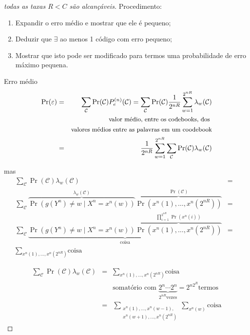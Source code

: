 \begin{frame}[allowframebreaks]
\begin{proof}[todas as taxas $R < C$ são alcançáveis]
  \proofbreak

  Procedimento:
  \begin{enumerate}
  \item Expandir o erro médio e mostrar que ele é pequeno;
  \item Deduzir que $\exists$ ao menos 1 código com erro pequeno;
  \item Mostrar que isto pode ser modificado para termos uma probabilidade de erro máximo pequena.
  \end{enumerate}

  \proofbreak
  Erro médio
  \begin{eqnarray}
  \Pr(\varepsilon) &=& \sum_{\mathcal{C}} \Pr(\mathcal{C}) P_e^{(n)}(\mathcal{C}) = \sum_{\mathcal{C}} \Pr(\mathcal{C}) \frac{1}{2^{nR}} \sum_{w=1}^{2^{nR}} \lambda_w(\mathcal{C}) \nonumber \\
	&& \text{\small valor médio, entre os codebooks, dos } \nonumber \\
	&& \text{\small valores médios entre as palavras em um coodebook} \nonumber \\
	&=& \frac{1}{2^{nR}} \sum_{w=1}^{2^{nR}} \sum_{\mathcal{C}} \Pr(\mathcal{C}) \lambda_w(\mathcal{C}) 
  \end{eqnarray}

  \proofbreak

  mas
  \vspace{-0.75cm}
  \begin{eqnarray}
  \sum_{\mathcal{C}} \Pr(\mathcal{C}) \lambda_w(\mathcal{C}) &=& \nonumber \\
  \sum_{\mathcal{C}} \overbrace{\Pr\left( g(Y^n) \neq w \mid X^n = x^n(w) \right)}^{\lambda_w(\mathcal{C})} \overbrace{\Pr\left( x^n(1), \ldots, x^n(2^{nR}) \right)}^{\Pr(\mathcal{C})} &=& \nonumber \\
  \sum_{\mathcal{C}} \underbrace{ \Pr\left( g(Y^n) \neq w \mid X^n = x^n(w) \right) \overbrace{\Pr\left( x^n(1), \ldots, x^n(2^{nR}) \right)}^{ \prod_{i=1}^{2^{nR}} \Pr(x^n(i)) }  }_{\text{coisa}} &=& \nonumber \\
  \sum_{ x^n(1), \ldots, x^n(2^{nR}) } \text{coisa} 
  \end{eqnarray}

  \proofbreak

  \vspace{-0.5cm}
  \begin{eqnarray}
  \sum_{\mathcal{C}} \Pr(\mathcal{C}) \lambda_w(\mathcal{C}) &=& \sum_{ x^n(1), \ldots, x^n(2^{nR}) } \text{coisa} \nonumber \\
	&& \text{somatório com } \underbrace{2^n \cdots 2^n}_{2^{nR} \text{vezes}} = 2^{n2^R} \text{termos} \nonumber \\
  	&=& 
  \sum_{ \substack{ x^n(1), \ldots, x^n(w-1),  \\ x^n(w+1), \ldots, x^n(2^{nR}) } } \sum_{x^n (w)} \text{coisa} 
  \end{eqnarray}


\end{proof}
\end{frame}
